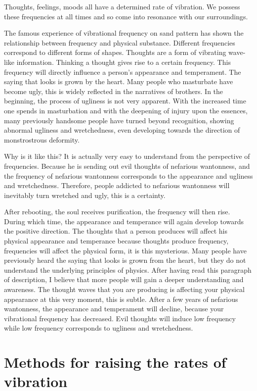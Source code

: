 \documentclass[
]{book}
\begin{document}
Thoughts, feelings, moods all have a determined rate of vibration. We possess these frequencies at all times and so come into resonance with our surroundings.

The famous experience of vibrational frequency on sand pattern has shown the relationship between frequency and physical substance. Different frequencies correspond to different forms of shapes. Thoughts are a form of vibrating wave-like information. Thinking a thought gives rise to a certain frequency. This frequency will directly influence a person's appearance and temperament. The saying that looks is grown by the heart. Many people who masturbate have become ugly, this is widely reflected in the narratives of brothers. In the beginning, the process of ugliness is not very apparent. With the increased time one spends in masturbation and with the deepening of injury upon the essences, many previously handsome people have turned beyond recognition, showing abnormal ugliness and wretchedness, even developing towards the direction of monstrostrous deformity.

Why is it like this? It is actually very easy to understand from the perspective of frequencies. Because he is sending out evil thoughts of nefarious wantonness, and the frequency of nefarious wantonness corresponds to the appearance and ugliness and wretchedness. Therefore, people addicted to nefarious wantonness will inevitably turn wretched and ugly, this is a certainty.

After rebooting, the soul receives purification, the frequency will then rise. During which time, the appearance and temperance will again develop towards the positive direction. The thoughts that a person produces will affect his physical appearance and temperance because thoughts produce frequency, frequencies will affect the physical form, it is this mysterious. Many people have previously heard the saying that looks is grown from the heart, but they do not understand the underlying principles of physics. After having read this paragraph of description, I believe that more people will gain a deeper understanding and awareness. The thought waves that you are producing is affecting your physical appearance at this very moment, this is subtle. After a few years of nefarious wantonness, the appearance and temperament will decline, because your vibrational frequency has decreased. Evil thoughts will induce low frequency while low frequency corresponds to ugliness and wretchedness.

\hypertarget{methods-for-raising-the-rates-of-vibration}{%
\section{Methods for raising the rates of vibration}\label{methods-for-raising-the-rates-of-vibration}}
\end{document}
